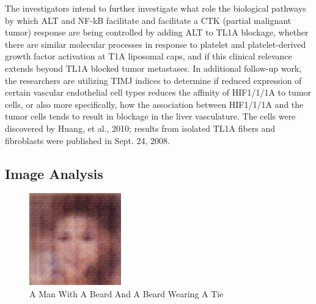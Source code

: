 \documentclass{article}%
\begin{document}
The investigators intend to further investigate what role the biological pathways by which ALT and NF{-}kB facilitate and facilitate a CTK (partial malignant tumor) response are being controlled by adding ALT to TL1A blockage, whether there are similar molecular processes in response to platelet and platelet{-}derived growth factor activation at T1A liposomal caps, and if this clinical relevance extends beyond TL1A blocked tumor metastases.\newline%
In additional follow{-}up work, the researchers are utilizing TIMJ indices to determine if reduced expression of certain vascular endothelial cell types reduces the affinity of HIF1/1/1A to tumor cells, or also more specifically, how the association between HIF1/1/1A and the tumor cells tends to result in blockage in the liver vasculature.\newline%
The cells were discovered by Huang, et al., 2010; results from isolated TL1A fibers and fibroblasts were published in Sept. 24, 2008.

%
\subsection{Image Analysis}%
\label{subsec:ImageAnalysis}%


\begin{figure}[h!]%
\centering%
\includegraphics[width=150px]{500_fake_images/samples_5_246.png}%
\caption{A Man With A Beard And A Beard Wearing A Tie}%
\end{figure}

%
\end{document}
